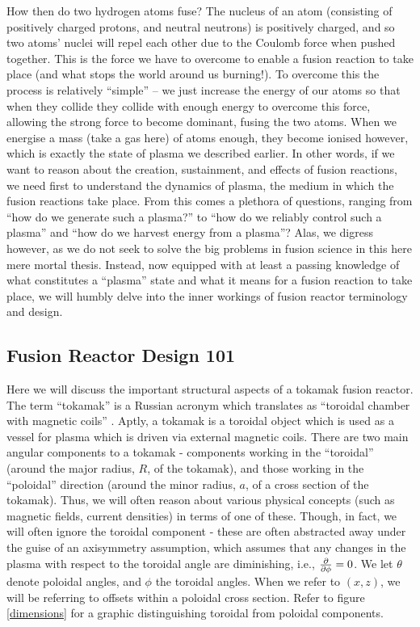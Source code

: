 How then do two hydrogen atoms fuse? The nucleus of an atom (consisting of positively charged 
protons, and neutral neutrons) is positively charged, and so two atoms' nuclei will repel each other due to the Coulomb force when pushed together. This is the force 
we have to overcome to enable a fusion reaction to take place (and what stops the world around us burning!). To overcome this the process is relatively ``simple'' -- 
we just increase the energy of our atoms so that when they collide they collide with enough energy to overcome this force, allowing the strong force to become
dominant, fusing the two atoms. When we energise a mass (take a gas here) of atoms enough, they become ionised however, which is 
exactly the state of plasma we described earlier. In other words, if we want to reason about the creation, sustainment, and effects of 
fusion reactions, we need first to understand the dynamics of plasma, the medium in which the fusion reactions take place. From this comes a plethora of questions, ranging from 
``how do we generate such a plasma?'' to ``how do we reliably control such a plasma'' and ``how do we harvest energy from a plasma''? Alas, we 
digress however, as we do not seek to solve the big problems in fusion science in this here mere mortal thesis. Instead, now equipped 
with at least a passing knowledge of what constitutes a ``plasma'' state and what it means for a fusion reaction to take place, 
we will humbly delve into the inner workings of fusion reactor terminology and design.


\subsection{Fusion Reactor Design 101}

Here we will discuss the important structural aspects of a tokamak fusion reactor. The term ``tokamak'' is a 
Russian acronym which translates as ``toroidal chamber with magnetic coils'' \cite{iter-tokamak-acronym}. Aptly, a tokamak is a toroidal 
object which is used as a vessel for plasma which is driven via external magnetic coils. There are two main angular components 
to a tokamak - components working in the ``toroidal'' (around the major radius, $R$, of the tokamak), and those working in the 
``poloidal'' direction (around the minor radius, $a$, of a cross section of the tokamak). Thus, we will often reason about 
various physical concepts (such as magnetic fields, current densities) in terms of one of these. Though, in fact, we will 
often ignore the toroidal component - these are often abstracted away under the guise of an axisymmetry assumption, which assumes 
that any changes in the plasma with respect to the toroidal angle are diminishing, i.e., $\pdv{\phi} = 0$. We let $\theta$ denote poloidal angles, 
and $\phi$ the toroidal angles. When we refer to $(x,z)$, we will be referring to offsets within a poloidal cross section. 
Refer to figure \ref{dimensions} for a graphic distinguishing toroidal from poloidal components.

